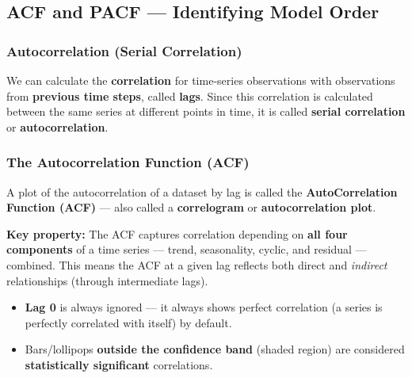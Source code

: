 \documentclass[12pt,openany]{book}
\begin{document}
\subsection{ACF and PACF --- Identifying Model Order}

\subsubsection{Autocorrelation (Serial Correlation)}

We can calculate the \textbf{correlation} for time-series observations with observations from \textbf{previous time steps}, called \textbf{lags}. Since this correlation is calculated between the same series at different points in time, it is called \textbf{serial correlation} or \textbf{autocorrelation}.

\subsubsection{The Autocorrelation Function (ACF)}

A plot of the autocorrelation of a dataset by lag is called the \textbf{AutoCorrelation Function (ACF)} --- also called a \textbf{correlogram} or \textbf{autocorrelation plot}.

\textbf{Key property:} The ACF captures correlation depending on \textbf{all four components} of a time series --- trend, seasonality, cyclic, and residual --- combined. This means the ACF at a given lag reflects both direct and \textit{indirect} relationships (through intermediate lags).


\begin{center}
\end{center}


\begin{itemize}[leftmargin=*]
    \item \textbf{Lag 0} is always ignored --- it always shows perfect correlation (a series is perfectly correlated with itself) by default.
    \item Bars/lollipops \textbf{outside the confidence band} (shaded region) are considered \textbf{statistically significant} correlations.
\end{itemize}
\end{document}
